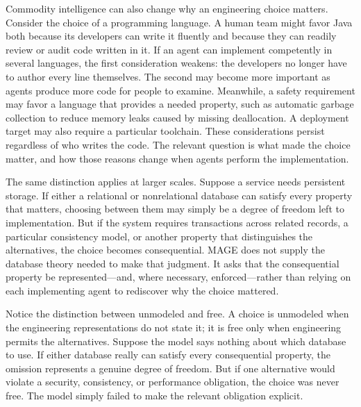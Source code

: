 Commodity intelligence can also change why an engineering choice matters. Consider the choice of a programming language. A human team might favor Java both because its developers can write it fluently and because they can readily review or audit code written in it. If an agent can implement competently in several languages, the first consideration weakens: the developers no longer have to author every line themselves. The second may become more important as agents produce more code for people to examine. Meanwhile, a safety requirement may favor a language that provides a needed property, such as automatic garbage collection to reduce memory leaks caused by missing deallocation. A deployment target may also require a particular toolchain. These considerations persist regardless of who writes the code. The relevant question is what made the choice matter, and how those reasons change when agents perform the implementation.

The same distinction applies at larger scales. Suppose a service needs persistent storage. If either a relational or nonrelational database can satisfy every property that matters, choosing between them may simply be a degree of freedom left to implementation. But if the system requires transactions across related records, a particular consistency model, or another property that distinguishes the alternatives, the choice becomes consequential. MAGE does not supply the database theory needed to make that judgment. It asks that the consequential property be represented---and, where necessary, enforced---rather than relying on each implementing agent to rediscover why the choice mattered.

Notice the distinction between unmodeled and free. A choice is unmodeled when the engineering representations do not state it; it is free only when engineering permits the alternatives. Suppose the model says nothing about which database to use. If either database really can satisfy every consequential property, the omission represents a genuine degree of freedom. But if one alternative would violate a security, consistency, or performance obligation, the choice was never free. The model simply failed to make the relevant obligation explicit.


